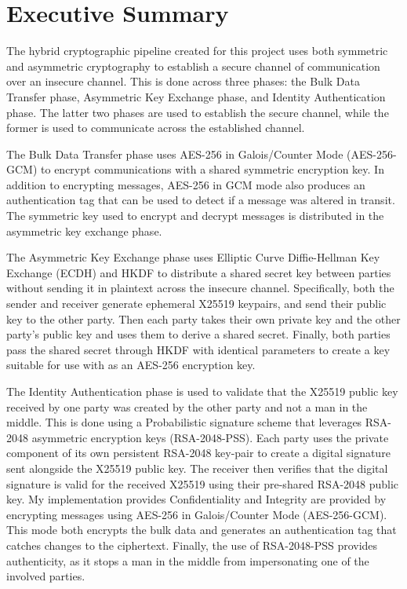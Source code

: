 \section{Executive Summary}
\par The hybrid cryptographic pipeline created for this project uses both symmetric and asymmetric cryptography to establish a secure channel of communication over an insecure channel. This is done across three phases: the Bulk Data Transfer phase, Asymmetric Key Exchange phase, and Identity Authentication phase. The latter two phases are used to establish the secure channel, while the former is used to communicate across the established channel.
\par The Bulk Data Transfer phase uses AES-256 in Galois/Counter Mode (AES-256-GCM) to encrypt communications with a shared symmetric encryption key. In addition to encrypting messages, AES-256 in GCM mode also produces an authentication tag that can be used to detect if a message was altered in transit. The symmetric key used to encrypt and decrypt messages is distributed in the asymmetric key exchange phase.
\par The Asymmetric Key Exchange phase uses Elliptic Curve Diffie-Hellman Key Exchange (ECDH) and HKDF to distribute a shared secret key between parties without sending it in plaintext across the insecure channel. Specifically, both the sender and receiver generate ephemeral X25519 keypairs, and send their public key to the other party. Then each party takes their own private key and the other party’s public key and uses them to derive a shared secret. Finally, both parties pass the shared secret through HKDF with identical parameters to create a key suitable for use with as an AES-256 encryption key.
\par The Identity Authentication phase is used to validate that the X25519 public key received by one party was created by the other party and not a man in the middle. This is done using a Probabilistic signature scheme that leverages RSA-2048 asymmetric encryption keys (RSA-2048-PSS). Each party uses the private component of its own persistent RSA-2048 key-pair to create a digital signature sent alongside the X25519 public key. The receiver then verifies that the digital signature is valid for the received X25519 using their pre-shared RSA-2048 public key.
 My implementation provides Confidentiality and Integrity are provided by encrypting messages using AES-256 in Galois/Counter Mode (AES-256-GCM). This mode both encrypts the bulk data and generates an authentication tag that catches changes to the ciphertext. Finally, the use of RSA-2048-PSS provides authenticity, as it stops a man in the middle from impersonating one of the involved parties.

